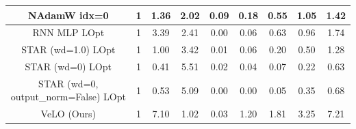 \begin{tabular}{||c c c c c c c c c||}
NAdamW idx=0 & 1 &1.36 & 2.02 & 0.09 & 0.18 & 0.55 & 1.05 & 1.42 \\
\hline
RNN MLP LOpt & 1 &3.39 & 2.41 & 0.00 & 0.06 & 0.63 & 0.96 & 1.74 \\
STAR (wd=1.0) LOpt & 1 &1.00 & 3.42 & 0.01 & 0.06 & 0.20 & 0.50 & 1.28 \\
STAR (wd=0) LOpt & 1 &0.41 & 5.51 & 0.02 & 0.04 & 0.07 & 0.22 & 0.63 \\
STAR (wd=0, output\_norm=False) LOpt & 1 &0.53 & 5.09 & 0.00 & 0.00 & 0.05 & 0.35 & 0.68 \\
\hline
VeLO (Ours) & 1 &7.10 & 1.02 & 0.03 & 1.20 & 1.81 & 3.25 & 7.21 \\

\hline

\end{tabular}